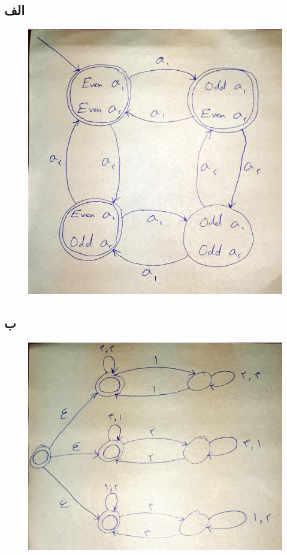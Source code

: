 \documentclass{article}
\begin{document}
\subsection{الف}
\begin{figure}[H]
    \centering
    \includegraphics[width=1\textwidth]{figures/6a.jpg}
    \caption
	{}
    \label{fig:fig1}
\end{figure}
\subsection{ب}
\begin{figure}[H]
    \centering
    \includegraphics[width=1\textwidth]{figures/6b.jpg}
    \caption
	{}
    \label{fig:fig1}
\end{figure}
\end{document}
